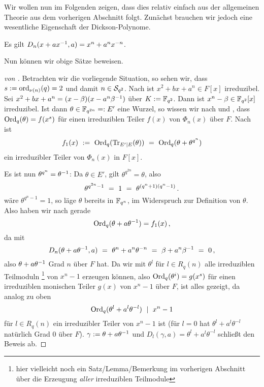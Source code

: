 Wir wollen nun im Folgenden zeigen, dass dies relativ einfach aus der
allgemeinen Theorie aus dem vorherigen Abschnitt folgt.
Zunächst brauchen wir jedoch eine wesentliche Eigenschaft der Dickson-Polynome.

\begin{lemma}[{??}]
  \label{lemma:dickson:dickson_polynome_potenz}
  Es gilt $D_n(x+a x\inv,a) = x^n + a^n x^{-n}$.
\end{lemma}

Nun können wir obige Sätze beweisen.

\begin{proof}[von ]
  Betrachten wir die vorliegende Situation, so sehen wir, dass
  $s := \ord_{\nu(n)}(q) = 2$ und damit $n \in \S_{q^2}$.
  Nach \thref{} ist $x^2 +bx+a^n \in F[x]$ irreduzibel. Sei 
  $x^2+bx+a^n = (x -\beta)(x -a^n\beta\inv)$ über $K := \F_{q^2}$.
  Dann ist $x^n-\beta \in \F_{q^2}[x]$ irreduzibel.
  Ist dann $\theta \in \F_{q^{2n}} =: E'$ eine Wurzel, so wissen wir nach
   und , dass
  $\Ord_q(\theta) = f(x^s)$ für einen irreduziblen Teiler $f(x)$ von
  $\Phi_n(x)$ über $F$. Nach 
  ist
  \[ f_1(x) \speq{:=} \Ord_q( \Tr_{E'\mid E}(\theta) ) \speq=
    \Ord_q(\theta + \theta^{q^n})\]
  ein irreduzibler Teiler von $\Phi_n(x)$ in $F[x]$.
  
  Es ist nun $\theta^{q^n} = \theta\inv$: 
  Da $\theta \in E'$, gilt $\theta^{q^{2n}} = \theta$, also
  \[ \theta^{q^{2n}-1} \speq= 1 \speq= \theta^{(q^n+1)(q^n-1)}\,. \]
  wäre $\theta^{q^n-1} = 1$, so läge $\theta$ bereits in $\F_{q^n}$, im Widerspruch
  zur Definition von $\theta$.
  Also haben wir nach  
  gerade 
  \[ \Ord_q(\theta + a\theta\inv) = f_1(x)\,,\]
  da mit 
  \[ D_n(\theta + a\theta\inv,a) \speq= \theta^n + a^n\theta^{-n}
    \speq= \beta +a^n\beta\inv \speq= 0\,,\]
  also $\theta + a\theta\inv$ Grad $n$ über $F$ hat.
  Da wir mit $\theta^l$ für $l \in R_q(n)$ alle irreduziblen Teilmoduln
  \footnote{hier vielleicht noch ein Satz/Lemma/Bemerkung im vorherigen 
  Abschnitt über die Erzeugung \emph{aller} irreduziblen Teilmodule}
  von $x^n-1$ erzeugen können, also $\Ord_q(\theta^i) = g(x^s)$ für einen
  irreduziblen monischen Teiler $g(x)$ von $x^n-1$ über $F$, ist alles gezeigt,
  da analog zu oben
  \[ \Ord_q(\theta^l + a^l\theta^{-l}) \speq\mid x^n-1 \]
  für $l\in R_q(n)$ ein irreduzibler Teiler von $x^n-1$ ist
  (für $l=0$ hat $\theta^l+a^l\theta^{-l}$ natürlich Grad $0$ über $F$).
  $\gamma := \theta + a\theta\inv$ und $D_l(\gamma,a) =
  \theta^l+a^l\theta^{-l}$ schließt den Beweis ab.
\end{proof}


